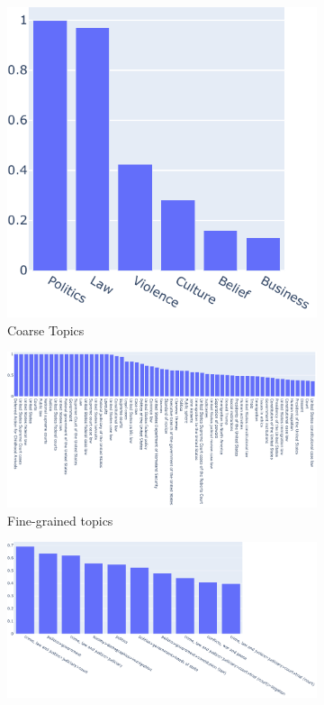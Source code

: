 \begin{figure}
\begin{subfigure}{0.3\textwidth}
		\includegraphics[width=\textwidth]{figures/coarse_topics.pdf}
		\caption{Coarse Topics} %
            \label{fig:topic_analysis_different_tools_coarse} 
	\end{subfigure}
	\begin{subfigure}{0.8\textwidth} %
		\includegraphics[width=\textwidth]{figures/finegrained_topics.pdf}
		\caption{Fine-grained topics} %
            \label{fig:topic_analysis_different_tools_fine} 
	\end{subfigure}
	\begin{subfigure}{0.8\textwidth} %
		\includegraphics[width=\textwidth]{figures/mediatopics.pdf}

\end{subfigure}
\end{figure}
